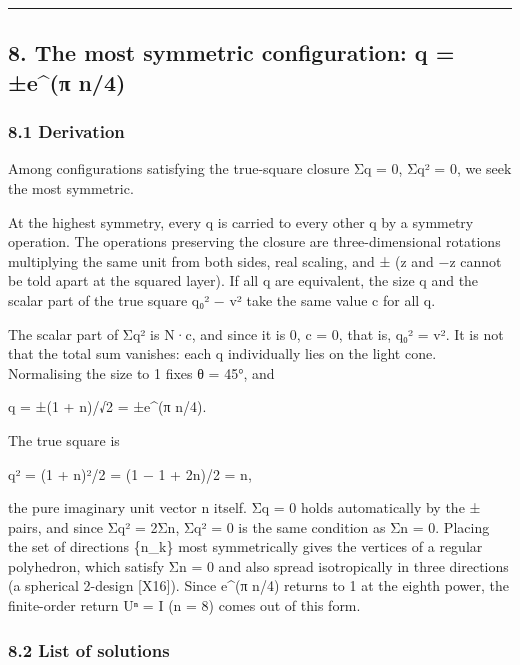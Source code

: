 \documentclass[
  a4paper,
]{article}
\begin{document}
\begin{center}\rule{0.5\linewidth}{0.5pt}\end{center}

\subsection{8. The most symmetric configuration: q = ±e\^{}(π
n/4)}\label{the-most-symmetric-configuration-q-eux3c0-n4}

\subsubsection{8.1 Derivation}\label{derivation}

Among configurations satisfying the true-square closure Σq = 0, Σq² = 0,
we seek the most symmetric.

At the highest symmetry, every q is carried to every other q by a
symmetry operation. The operations preserving the closure are
three-dimensional rotations multiplying the same unit from both sides,
real scaling, and ± (z and −z cannot be told apart at the squared
layer). If all q are equivalent, the size \textbar q\textbar{} and the
scalar part of the true square q₀² − \textbar v\textbar² take the same
value c for all q.

The scalar part of Σq² is N·c, and since it is 0, c = 0, that is, q₀² =
\textbar v\textbar². It is not that the total sum vanishes: each q
individually lies on the light cone. Normalising the size to 1 fixes θ =
45°, and

q = ±(1 + n)/√2 = ±e\^{}(π n/4).

The true square is

q² = (1 + n)²/2 = (1 − 1 + 2n)/2 = n,

the pure imaginary unit vector n itself. Σq = 0 holds automatically by
the ± pairs, and since Σq² = 2Σn, Σq² = 0 is the same condition as Σn =
0. Placing the set of directions \{n\_k\} most symmetrically gives the
vertices of a regular polyhedron, which satisfy Σn = 0 and also spread
isotropically in three directions (a spherical 2-design {[}X16{]}).
Since e\^{}(π n/4) returns to 1 at the eighth power, the finite-order
return Uⁿ = I (n = 8) comes out of this form.

\subsubsection{8.2 List of solutions}\label{list-of-solutions}
\end{document}
